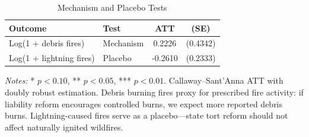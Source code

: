 \begin{table}[H]
\centering
\caption{Mechanism and Placebo Tests}
\label{tab:mechanism}
\begin{threeparttable}
\begin{tabular}{l l cc}
\toprule
Outcome & Test & ATT & (SE) \\
\midrule
Log(1 + debris fires) & Mechanism & 0.2226 & (0.4342) \\
Log(1 + lightning fires) & Placebo & -0.2610 & (0.2333) \\
\bottomrule
\end{tabular}
\begin{tablenotes}[flushleft]
\small
\item \textit{Notes:} * $p<0.10$, ** $p<0.05$, *** $p<0.01$. Callaway--Sant'Anna ATT with doubly robust estimation. Debris burning fires proxy for prescribed fire activity: if liability reform encourages controlled burns, we expect more reported debris burns. Lightning-caused fires serve as a placebo---state tort reform should not affect naturally ignited wildfires.
\end{tablenotes}
\end{threeparttable}
\end{table}

